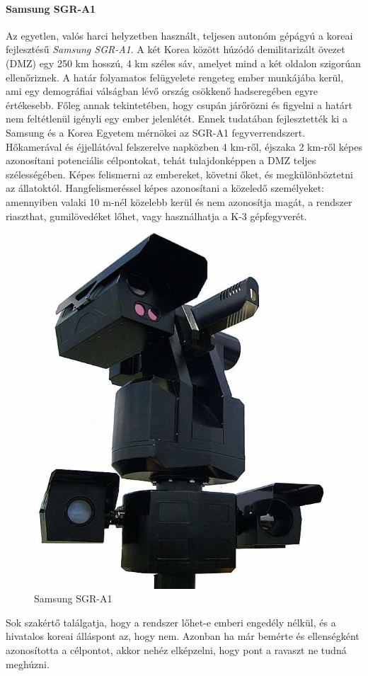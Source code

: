 \documentclass[12pt,a4paper]{article}
\begin{document}
\paragraph{Samsung SGR-A1}
Az egyetlen, valós harci helyzetben használt, teljesen autonóm gépágyú a koreai fejlesztésű \textsl{Samsung SGR-A1}. A két Korea között húzódó demilitarizált övezet (DMZ) egy 250 km hosszú, 4 km széles sáv, amelyet mind a két oldalon szigorúan ellenőriznek. A határ folyamatos felügyelete rengeteg ember munkájába kerül, ami egy demográfiai válságban lévő ország csökkenő hadseregében egyre értékesebb. Főleg annak tekintetében, hogy csupán járőrözni és figyelni a határt nem feltétlenül igényli egy ember jelenlétét. Ennek tudatában fejlesztették ki a Samsung és a Korea Egyetem mérnökei az SGR-A1 fegyverrendszert. Hőkamerával és éjjellátóval felszerelve napközben 4 km-ről, éjszaka 2 km-ről képes azonosítani potenciális célpontokat, tehát tulajdonképpen a DMZ teljes szélességében. Képes felismerni az embereket, követni őket, és megkülönböztetni az állatoktól. Hangfelismeréssel képes azonosítani a közeledő személyeket: amennyiben valaki 10 m-nél közelebb kerül és nem azonosítja magát, a rendszer riaszthat, gumilövedéket lőhet, vagy használhatja a K-3 gépfegyverét.

\begin{figure}[h!]
	\centering
	\includegraphics[width=0.5\linewidth]{irod_samsung}
	\caption{Samsung SGR-A1}
	\label{fig:irod_samsung}
\end{figure}

Sok szakértő találgatja, hogy a rendszer lőhet-e emberi engedély nélkül, és a hivatalos koreai álláspont az, hogy nem. Azonban ha már bemérte és ellenségként azonosította a célpontot, akkor nehéz elképzelni, hogy pont a ravaszt ne tudná meghúzni.
\end{document}
